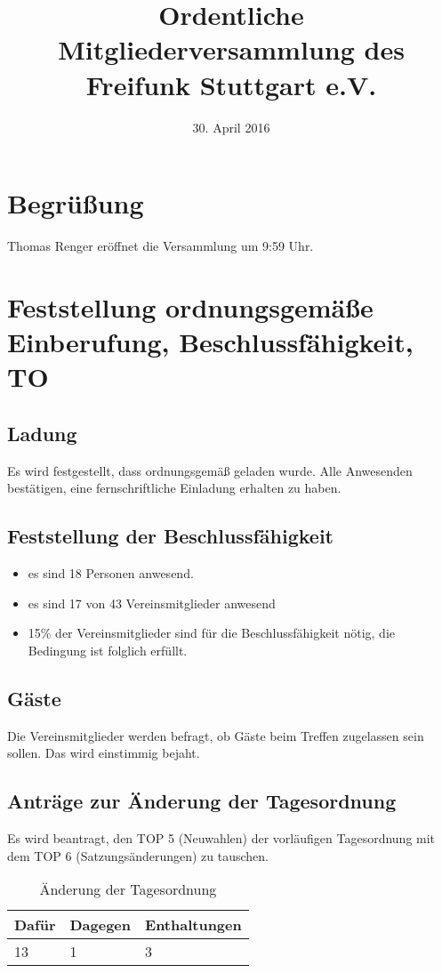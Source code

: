 \documentclass[a4paper]{scrartcl}
\date{30. April 2016}
\title{Ordentliche Mitgliederversammlung des Freifunk Stuttgart e.V.}
\begin{document}
\maketitle

\tableofcontents

\clearpage

\listoftables

\clearpage

\section{Begrüßung}
Thomas Renger eröffnet die Versammlung um  9:59 Uhr.

\section{Feststellung ordnungsgemäße Einberufung, Beschlussfähigkeit, TO}
\subsection{Ladung}
Es wird festgestellt, dass ordnungsgemäß geladen wurde. Alle Anwesenden bestätigen, eine fernschriftliche Einladung erhalten zu haben.

\subsection{Feststellung der Beschlussfähigkeit}
\begin{itemize}
\item es sind 18 Personen anwesend.
\item es sind 17 von 43 Vereinsmitglieder anwesend
\item 15\% der Vereinsmitglieder sind für die Beschlussfähigkeit nötig, die Bedingung ist folglich erfüllt.
\end{itemize}
\subsection{Gäste} 
Die Vereinsmitglieder werden befragt, ob Gäste beim Treffen zugelassen sein sollen. Das wird einstimmig bejaht.

\subsection{Anträge zur Änderung der Tagesordnung}
Es wird beantragt, den TOP 5 (Neuwahlen) der vorläufigen Tagesordnung mit dem TOP 6 (Satzungsänderungen) zu tauschen.
\begin{table}[h]
	\begin{tabularx}{\textwidth}{XXX}
		Dafür & Dagegen & Enthaltungen\\
		\toprule
		13 & 1 & 3\\
	\end{tabularx}
	\caption{Änderung der Tagesordnung}
\end{table}
\end{document}
